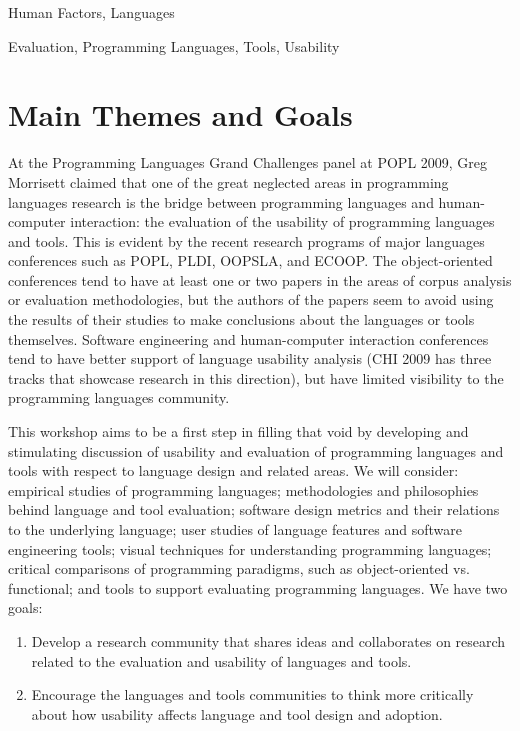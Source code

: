 \documentclass[9pt]{sigplanconf}
\begin{document}

\terms
Human Factors, Languages

\keywords
Evaluation, Programming Languages, Tools, Usability


\section{Main Themes and Goals}

At the Programming Languages Grand Challenges panel at POPL 2009, Greg
Morrisett claimed that one of the great neglected areas in programming
languages research is the bridge between programming languages and
human-computer interaction: the evaluation of the usability of
programming languages and tools. This is evident by the recent
research programs of major languages conferences such as POPL, PLDI,
OOPSLA, and ECOOP. The object-oriented conferences tend to have at
least one or two papers in the areas of corpus analysis or evaluation
methodologies, but the authors of the papers seem to avoid using the
results of their studies to make conclusions about the languages or
tools themselves. Software engineering and human-computer interaction
conferences tend to have better support of language usability analysis
(CHI 2009 has three tracks that showcase research in this direction),
but have limited visibility to the programming languages community.

This workshop aims to be a first step in filling that void by
developing and stimulating discussion of usability and evaluation of
programming languages and tools with respect to language design and
related areas. We will consider: empirical studies of programming
languages; methodologies and philosophies behind language and tool
evaluation; software design metrics and their relations to the
underlying language; user studies of language features and software
engineering tools; visual techniques for understanding programming
languages; critical comparisons of programming paradigms, such as
object-oriented vs. functional; and tools to support evaluating
programming languages. We have two goals:

\begin{enumerate}
  \item 
Develop a research community that shares ideas and collaborates on 
research related to the evaluation and usability of languages and tools.
\item
Encourage the languages and tools communities to think more critically
about how usability affects language and tool design and
adoption.
\end{enumerate}
\end{document}
